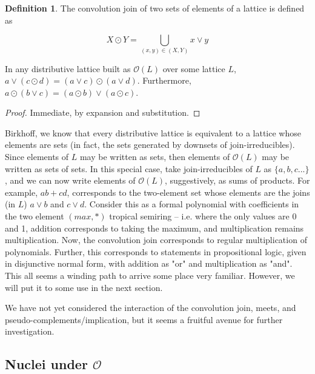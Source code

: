 \documentclass[hoptionsi,review,format=sigplan]{acmart}
\theoremstyle{definition}
\newtheorem{definition}{Definition}[section]
\newcommand{\Oc}{\mathcal{O}}
\begin{document}
\begin{definition}
The convolution join of two sets of elements of a lattice is defined as 

\begin{equation}
X \odot Y = \bigcup_{(x,y) \in (X,Y)} x \vee y
\end{equation}

\end{definition}

\begin{lemma}
In any distributive lattice built as  \(\Oc(L)\) over some lattice \(L\), \(a \vee (c \odot d) = (a \vee c) \odot (a \vee d)\). Furthermore, \(a \odot (b \vee c) = (a \odot b) \vee (a \odot c)\).
\end{lemma}
\begin{proof}
Immediate, by expansion and substitution.
\end{proof}

Birkhoff, we know that every distributive lattice is equivalent to a lattice whose elements are sets (in fact, the sets generated by downsets of join-irreducibles). Since elements of \(L\) may be written as sets, then elements of \(\Oc(L)\) may be written as sets of sets. In this special case, take join-irreducibles of \(L\) as \(\{a, b, c...\}\), and we can now write elements of \(\Oc(L)\), suggestively, as sums of products. For example, \(ab + cd\), corresponds to the two-element set whose elements are the joins (in \(L\)) \(a \vee b\) and \(c \vee d\). Consider this as a formal polynomial with coefficients in the two element \((max,*)\) tropical semiring -- i.e. where the only values are 0 and 1, addition corresponds to taking the maximum, and multiplication remains multiplication. Now, the convolution join corresponds to regular multiplication of polynomials. Further, this corresponds to statements in propositional logic, given in disjunctive normal form, with addition as "or" and multiplication as "and". This all seems a winding path to arrive some place very familiar. However, we will put it to some use in the next section.

We have not yet considered the interaction of the convolution join, meets, and pseudo-complements/implication, but it seems a fruitful avenue for further investigation.

\subsection{Nuclei under \(\Oc\)}
\end{document}

